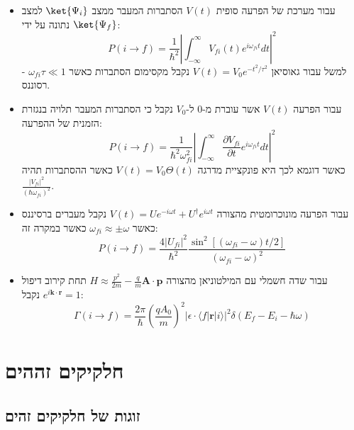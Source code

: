 \documentclass{tstextbook}
\begin{document}
\begin{summary}
  \begin{itemize}
    \item עבור מערכת של הפרעה סופית \(V(t)\) הסתברות המעבר ממצב \(\ket{\Psi_{i}}\) למצב \(\ket{\Psi_{f}}\) נתונה על ידי:
$$P(i\to f)={\frac{1}{\hbar^{2}}}\left|\int_{-\infty}^{\infty}V_{f i}(t)e^{i\omega_{f i}t}d t\right|^{2}$$
למשל עבור גאוסיאן \(V(t)=V_{0}e^{ -t^{2}/\tau^{2} }\) נקבל מקסימום הסתברות כאשר \(\omega_{fi}\tau\ll 1\) - רסוננס.
    \item עבור הפרעה \(V(t)\) אשר עוברת מ-0 ל-\(V_{0}\) נקבל כי הסתברות המעבר תלויה בנגזרת הזמנית של ההפרעה:
$$P(i\to f)=\frac{1}{\hbar^{2}\omega_{f i}^{2}}\left|\int_{-\infty}^{\infty}\frac{\partial V_{f i}}{\partial t}e^{i\omega_{f i}t}d t\right|^{2}$$
כאשר דוגמא לכך היא פונקציית מדרגה \(V(t)=V_{0}\Theta(t)\) כאשר ההסתברות תהיה \(\frac{|V_{fi}|^{2}}{(\hbar \omega_{fi})^{2}}\).
    \item עבור הפרעה מונוכרומטית מהצורה \(V(t)=U e^{-i\omega t}+U^{\dagger}e^{i\omega t}\) נקבל מעברים ברסיננס כאשר \(\omega_{fi}\approx\pm \omega\) כאשר במקרה זה:
$$P(i\to f)=\frac{4|U_{f i}|^{2}}{\hbar^{2}}\frac{\sin^{2}[(\omega_{f i}-\omega)t/2]}{(\omega_{f i}-\omega)^{2}}$$
    \item עבור שדה חשמלי עם המילטוניאן מהצורה \(H\approx \frac{p^{2}}{2m}-\frac{q}{m}\mathbf{A\cdot p}\) תחת קירוב דיפול \(e^{ i\mathbf{k\cdot r} }=1\) נקבל:
$$\Gamma(i\to f)=\frac{2\pi}{\hbar}\left(\frac{q A_{0}}{m}\right)^{2}|\epsilon\cdot\langle f|\mathbf{r}|i\rangle|^{2}\delta(E_{f}-E_{i}-\hbar\omega)$$
  \end{itemize}
\end{summary}
\section{חלקיקים זההים}

\subsection{זוגות של חלקיקים זהים}
\end{document}
